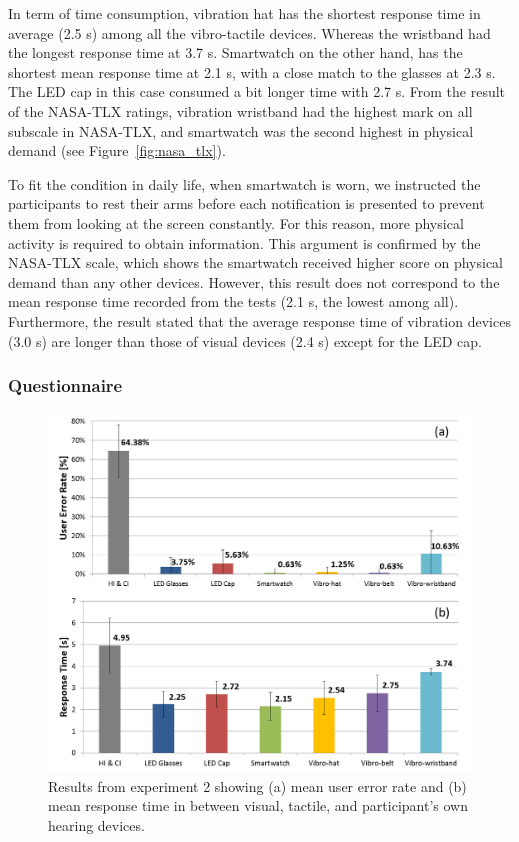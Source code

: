 \documentclass{sigchi}
\begin{document}
In term of time consumption, vibration hat has the shortest response time in average (2.5 s) among all the vibro-tactile devices. Whereas the wristband had the longest response time at 3.7 s. Smartwatch on the other hand, has the shortest mean response time at 2.1 s, with a close match to the glasses at 2.3 s. The LED cap in this case consumed a bit longer time with 2.7 s. From the result of the NASA-TLX ratings, vibration wristband had the highest mark on all subscale in NASA-TLX, and smartwatch was the second highest in physical demand (see Figure~\ref{fig:nasa_tlx}). 

To fit the condition in daily life, when smartwatch is worn, we instructed the participants to rest their arms before each notification is presented to prevent them from looking at the screen constantly. For this reason, more physical activity is required to obtain information. This argument is confirmed by the NASA-TLX scale, which shows the smartwatch received higher score on physical demand than any other devices. However, this result does not correspond to the mean response time recorded from the tests (2.1 s, the lowest among all). Furthermore, the result stated that the average response time of vibration devices (3.0 s) are longer than those of visual devices (2.4 s) except for the LED cap.

\subsubsection{Questionnaire}


\begin{figure}[!t]
\centering
\includegraphics[width=\columnwidth]{stage2_ER&RT}
\caption{Results from experiment 2 showing (a) mean user error rate and (b) mean response time in between visual, tactile, and participant's own hearing devices.}
\label{fig:stage2_ER&RT}
\end{figure}
\end{document}
